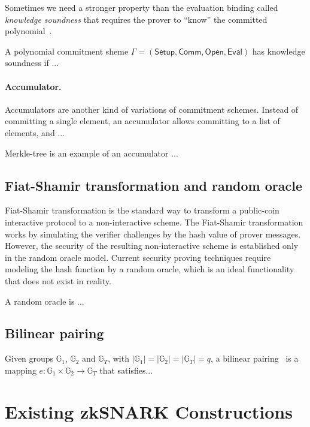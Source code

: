 \documentclass[acmtog]{acmart}
\newcommand{\bbG}{\mathbb{G}}
\newcommand{\Setup}{\mathsf{Setup}}
\newcommand{\Comm}{\mathsf{Comm}}
\newcommand{\Open}{\mathsf{Open}}
\newcommand{\Eval}{\mathsf{Eval}}
\begin{document}
Sometimes we need a stronger property than the evaluation binding called \emph{knowledge soundness} that requires the prover to ``know'' the committed polynomial~\cite{BunzFS20}.

\begin{definition}
A polynomial commitment sheme $\Gamma=(\Setup,\Comm,\Open,\Eval)$ has knowledge soundness if ...
\end{definition}

\paragraph{Accumulator.}
Accumulators are another kind of variations of commitment schemes.
Instead of committing a single element, an accumulator allows committing to a list of elements, and ...

Merkle-tree is an example of an accumulator ...

\subsection{Fiat-Shamir transformation and random oracle}
\label{sec:fiat.shamir}

Fiat-Shamir transformation is the standard way to transform a public-coin interactive protocol to a non-interactive scheme.
The Fiat-Shamir transformation works by simulating the verifier challenges by the hash value of prover messages.
However, the security of the resulting non-interactive scheme is established only in the random oracle model.
Current security proving techniques require modeling the hash function by a random oracle, which is an ideal functionality that does not exist in reality.

A random oracle is ...

\subsection{Bilinear pairing}
\label{sec:pairing}

Given groups $\bbG_1$, $\bbG_2$ and $\bbG_T$, with $|\bbG_1|=|\bbG_2|=|\bbG_T|=q$, a bilinear pairing~\cite{BonehF01} is a mapping $e:\bbG_1\times\bbG_2\to\bbG_T$ that satisfies...

\section{Existing zkSNARK Constructions}
\label{sec:construction}
\end{document}
